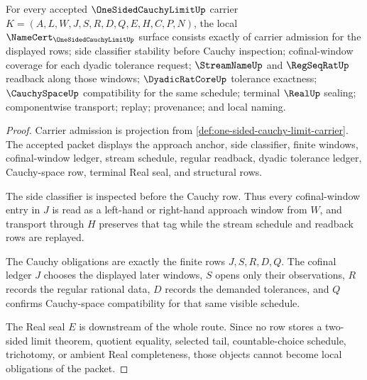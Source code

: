 \begin{theorem}\label{thm:one-sided-cauchy-limit-namecert-obligations}
For every accepted $\OneSidedCauchyLimitUp$ carrier $K=(A,L,W,J,S,R,D,Q,E,H,C,P,N)$, the local $\NameCert_{\OneSidedCauchyLimitUp}$ surface consists exactly of carrier admission for the displayed rows; side classifier stability before Cauchy inspection; cofinal-window coverage for each dyadic tolerance request; $\StreamNameUp$ and $\RegSeqRatUp$ readback along those windows; $\DyadicRatCoreUp$ tolerance exactness; $\CauchySpaceUp$ compatibility for the same schedule; terminal $\RealUp$ sealing; componentwise transport; replay; provenance; and local naming.
\end{theorem}
\begin{proof}
Carrier admission is projection from \autoref{def:one-sided-cauchy-limit-carrier}. The accepted packet displays the approach anchor, side classifier, finite windows, cofinal-window ledger, stream schedule, regular readback, dyadic tolerance ledger, Cauchy-space row, terminal Real seal, and structural rows.

The side classifier is inspected before the Cauchy row. Thus every cofinal-window entry in $J$ is read as a left-hand or right-hand approach window from $W$, and transport through $H$ preserves that tag while the stream schedule and readback rows are replayed.

The Cauchy obligations are exactly the finite rows $J,S,R,D,Q$. The cofinal ledger $J$ chooses the displayed later windows, $S$ opens only their observations, $R$ records the regular rational data, $D$ records the demanded tolerances, and $Q$ confirms Cauchy-space compatibility for that same visible schedule.

The Real seal $E$ is downstream of the whole route. Since no row stores a two-sided limit theorem, quotient equality, selected tail, countable-choice schedule, trichotomy, or ambient Real completeness, those objects cannot become local obligations of the packet.
\end{proof}

